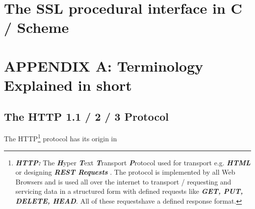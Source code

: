 \documentclass[10pt,a4paper,english]{article}
\newcommand{\abbrhighcol}[1]{\textbf{\textit{#1}}}
\begin{document}
\begin{multicols}{2}
\section{The SSL procedural interface in C / Scheme}

\begin{flushleft}
\end{flushleft}



\section{APPENDIX A: Terminology Explained in short}
\subsection{The HTTP 1.1 / 2 / 3 Protocol}
\begin{flushleft}
The HTTP\footnote{\abbrhighcol{HTTP:}  The \abbrhighcol{H}yper \abbrhighcol{T}ext \abbrhighcol {T}ransport \abbrhighcol {P}rotocol used for transport  e.g. \abbrhighcol{HTML} or designing  \abbrhighcol{REST Requests} . The protocol is implemented by all Web Browsers and is used all over the internet to transport / requesting and servicing data in a structured form with defined requests like \abbrhighcol{GET, PUT, DELETE, HEAD}. All of these requestshave a defined response format.} protocol has its origin in 
\end{flushleft}




\end{multicols}
\end{document}
